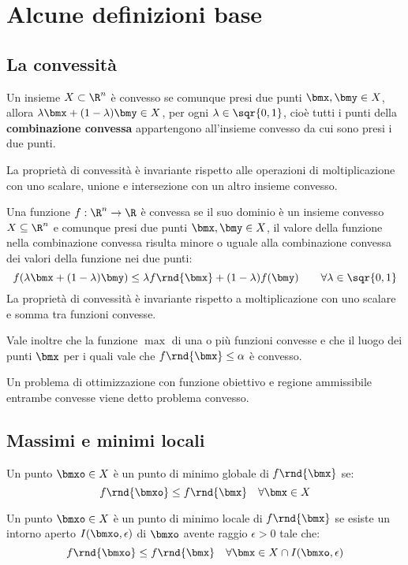 \documentclass[\main/main.tex]{subfiles}
\begin{document}
\chapter{Alcune definizioni base}
\section{La convessità}
\begin{definition}
    Un insieme \(X \subset \R^n\) è convesso se comunque presi due punti \(\bmx,\bmy \in X\), allora \(\lambda\bmx + (1-\lambda)\bmy \in X\), per ogni \(\lambda \in \sqr{0,1}\), cioè tutti i punti della \textbf{combinazione convessa} appartengono all'insieme convesso da cui sono presi i due punti.

    La proprietà di convessità è invariante rispetto alle operazioni di moltiplicazione con uno scalare, unione e intersezione con un altro insieme convesso.
\end{definition}
\begin{definition}
    Una funzione \(f: \R^n \rightarrow \R \) è convessa se il suo dominio è un insieme convesso \(X \subseteq \R^n\) e comunque presi due punti \(\bmx, \bmy \in X\), il valore della funzione nella combinazione convessa risulta minore o uguale alla combinazione convessa dei valori della funzione nei due punti:
    \[
        f(\lambda\bmx + (1-\lambda)\bmy) \leq \lambda f\rnd{\bmx} + (1-\lambda)f(\bmy) \qquad \forall \lambda \in \sqr{0,1}
    \]
    La proprietà di convessità è invariante rispetto a moltiplicazione con uno scalare e somma tra funzioni convesse.

    Vale inoltre che la funzione \(\max \) di una o più funzioni convesse e che il luogo dei punti \(\bmx \) per i quali vale che \(f\rnd{\bmx} \leq \alpha \) è convesso.
\end{definition}
\begin{definition}
    Un problema di ottimizzazione con funzione obiettivo e regione ammissibile entrambe convesse viene detto problema convesso.
\end{definition}
\section{Massimi e minimi locali}
\begin{definition}
    Un punto \(\bmxo \in X\) è un punto di minimo globale di \(f\rnd{\bmx}\) se:
    \[
        f\rnd{\bmxo} \leq f\rnd{\bmx} \quad \forall \bmx \in X
    \]\end{definition}
\begin{definition}
    Un punto \(\bmxo \in X\) è un punto di minimo locale di \(f\rnd{\bmx}\) se esiste un intorno aperto \(I(\bmxo, \epsilon)\) di \(\bmxo \) avente raggio \(\epsilon >0\) tale che:
    \[
        f\rnd{\bmxo} \leq f\rnd{\bmx} \quad \forall \bmx \in X \cap I(\bmxo, \epsilon)
    \]\end{definition}
\end{document}
